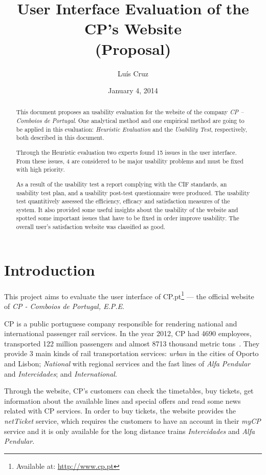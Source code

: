\documentclass[a4paper]{article}
\title{User Interface Evaluation of the CP's Website\\ (Proposal)}
\author[1]{Luís  Cruz}
\affil[1]{MAP-i\\ Joint Doctoral Programme in Computer Science}
\date{January 4, 2014}
\begin{document}
\maketitle

\begin{abstract}
This document proposes an usability evaluation for the website of the company \emph{CP -- Comboios de Portugal}.
One analytical method and one empirical method are going to be applied in this evaluation: \emph{Heuristic Evaluation} and the \emph{Usability Test}, respectively, both described in this document.
  
Through the Heuristic evaluation two experts found 15 issues in the user interface. From these issues, 4 are considered to be major usability problems and must be fixed with high priority.

As a result of the usability test a report complying with the CIF standards, an usability test plan, and a usability post-test questionnaire were produced. The usability test quantitively assessed the efficiency, efficacy and satisfaction measures of the system. It also provided some useful insights about the usability of the website and spotted some important issues that have to be fixed in order improve usability. The overall user's satisfaction website was classified as good. 

\end{abstract}

\section{Introduction}

This project aims to evaluate the user interface of CP.pt\footnote{Available at: \url{http://www.cp.pt}} --- the official website of \emph{CP - Comboios de Portugal, E.P.E}.

CP is a public portuguese company responsible for rendering national and international passenger rail services. In the year 2012, CP had 4690 employees, transported 122 million passengers and almost 8713 thousand metric tons~\citep{CP2012aa}. They provide 3 main kinds of rail transportation services: \emph{urban} in the cities of Oporto and Lisbon; \emph{National} with regional services and the fast lines of \emph{Alfa Pendular} and \emph{Intercidades}; and \emph{International}.

Through the website, CP's customers can check the timetables, buy tickets, get information about the available lines and special offers and read some news related with CP services. In order to buy tickets, the website provides the \emph{netTicket} service, which requires the customers to have an account in their \emph{myCP} service and it is only available for the long distance trains \emph{Intercidades} and \emph{Alfa Pendular}.
\end{document}
